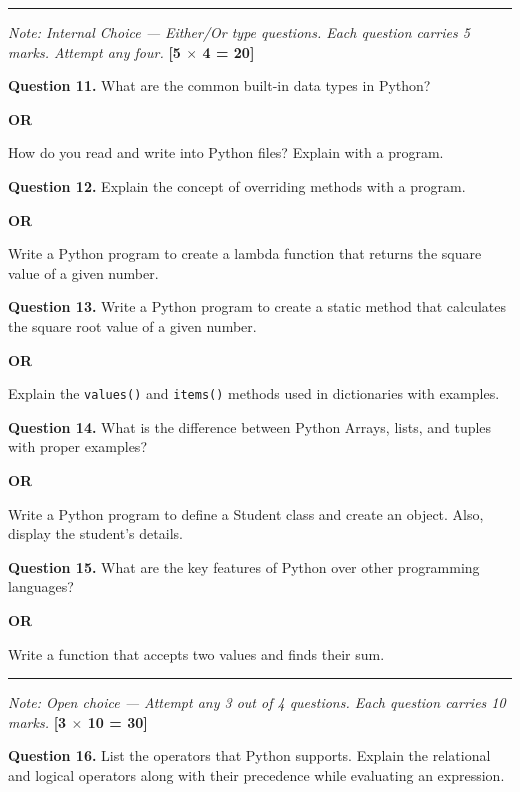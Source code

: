 \documentclass[11pt,a4paper]{article}
\begin{document}
\bigskip


\rule{\linewidth}{0.4pt}\smallskip




\noindent   \textit{Note: Internal Choice --- Either/Or type questions. Each question carries 5 marks. Attempt any four.} \hfill   \textbf{[5 $ \times$ 4 = 20]}

\medskip


\noindent   \textbf{Question 11.} What are the common built-in data types in Python?
\centerline{   \textbf{OR}}
How do you read and write into Python files? Explain with a program.

\medskip


\noindent   \textbf{Question 12.} Explain the concept of overriding methods with a program.
\centerline{   \textbf{OR}}
Write a Python program to create a lambda function that returns the square value of a given number.

\medskip


\noindent   \textbf{Question 13.} Write a Python program to create a static method that calculates the square root value of a given number.
\centerline{   \textbf{OR}}
Explain the   \texttt{values()} and   \texttt{items()} methods used in dictionaries with examples.

\medskip


\noindent   \textbf{Question 14.} What is the difference between Python Arrays, lists, and tuples with proper examples?
\centerline{   \textbf{OR}}
Write a Python program to define a Student class and create an object. Also, display the student's details.

\medskip


\noindent   \textbf{Question 15.} What are the key features of Python over other programming languages?
\centerline{   \textbf{OR}}
Write a function that accepts two values and finds their sum.

\bigskip


\rule{\linewidth}{0.4pt}\smallskip




\noindent   \textit{Note: Open choice --- Attempt any 3 out of 4 questions. Each question carries 10 marks.} \hfill   \textbf{[3 $ \times$ 10 = 30]}

\medskip


\noindent   \textbf{Question 16.} List the operators that Python supports. Explain the relational and logical operators along with their precedence while evaluating an expression.
\end{document}
